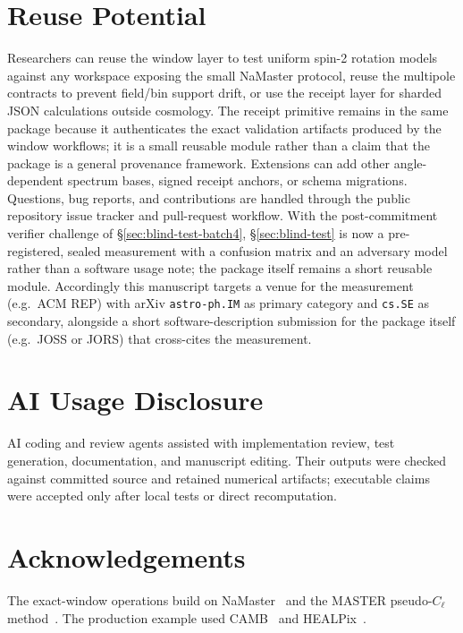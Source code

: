 \documentclass[11pt]{article}
\newcommand{\Cl}{C_\ell}
\begin{document}
\section{Reuse Potential}

Researchers can reuse the window layer to test uniform spin-2 rotation models
against any workspace exposing the small NaMaster protocol, reuse the multipole
contracts to prevent field/bin support drift, or use the receipt layer for
sharded JSON calculations outside cosmology. The receipt primitive remains in
the same package because it authenticates the exact validation artifacts
produced by the window workflows; it is a small reusable module rather than a
claim that the package is a general provenance framework. Extensions can add other
angle-dependent spectrum bases, signed receipt anchors, or schema migrations.
Questions, bug reports, and contributions are handled through the public
repository issue tracker and pull-request workflow. With the post-commitment
verifier challenge of \S\ref{sec:blind-test-batch4}, \S\ref{sec:blind-test}
is now a pre-registered, sealed measurement with a confusion matrix and an
adversary model rather than a software usage note; the package itself
remains a short reusable module. Accordingly this manuscript targets a
venue for the measurement (e.g.\ ACM REP) with arXiv \texttt{astro-ph.IM}
as primary category and \texttt{cs.SE} as secondary, alongside a short
software-description submission for the package itself (e.g.\ JOSS or JORS)
that cross-cites the measurement.

\section{AI Usage Disclosure}

AI coding and review agents assisted with implementation review, test
generation, documentation, and manuscript editing. Their outputs were checked
against committed source and retained numerical artifacts; executable claims
were accepted only after local tests or direct recomputation.

\section*{Acknowledgements}

The exact-window operations build on NaMaster~\cite{Alonso2019} and the MASTER
pseudo-\(\Cl\) method~\cite{Hivon2002}.  The production example used
CAMB~\cite{Lewis2000} and HEALPix~\cite{Gorski2005}.
\end{document}
